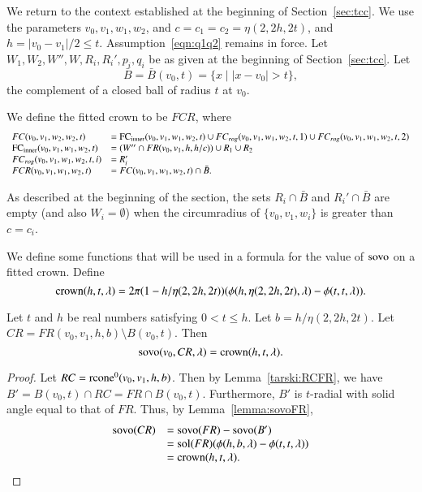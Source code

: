 We return to the context established at the beginning
of Section~\ref{sec:tcc}.  We use the parameters $v_0,v_1,w_1,w_2$,
and $c=c_1=c_2=\eta(2,2h,2t)$, and $h =|v_0-v_1|/2 \le t$. 
Assumption~\ref{eqn:q1q2} remains in force.
Let $W_1,W_2,W'',W,R_i,R_i',p_i,q_i$ be as given at the
beginning of Section~\ref{sec:tcc}.
%
Let 
  $$\bar B = \bar B(v_0,t) = \{x \mid |x-v_0| > t\},$$
the complement of a closed ball of radius $t$ at $v_0$.
%
\begin{definition}\label{def:fitted-crown}
We define the fitted crown to be $FCR$, where
$$
\begin{array}{lll}
FC(v_0,v_1,w_2,w_2,t) &= \FCinner(v_0,v_1,w_1,w_2,t) \cup 
      FC_{rog} (v_0,v_1,w_1,w_2,t,1)\cup FC_{rog}(v_0,v_1,w_1,w_2,t,2)\\
%
\FCinner(v_0,v_1,w_1,w_2,t) &= (W'' \cap FR(v_0,v_1,h,h/c))\cup R_1 \cup R_2 \\
%
FC_{rog} (v_0,v_1,w_1,w_2,t,i) &= R_i'\\
%
FCR(v_0,v_1,w_1,w_2,t) &= FC(v_0,v_1,w_1,w_2,t) \cap \bar B.
\end{array}
$$
\end{definition}

As described at the beginning of the section, the 
sets $R_i\cap \bar B$ and $R_i'\cap \bar B$ are empty
(and also $W_i=\emptyset$) when the circumradius of 
$\{v_0,v_1,w_i\}$ is greater than $c=c_i$.

We define some functions that will be used in a formula
for the value of ${\operatorname{sovo}}$ on a fitted crown.
Define
\begin{equation}\operatorname{crown}(h,t,\lambda) =
2\pi(1-h/\eta(2,2h,2t))(\phi(h,\eta(2,2h,2t),\lambda)-\phi(t,t,\lambda)). 
\end{equation} 

\begin{lemma}\label{lemma:sovo:CR} 
Let $t$ and $h$ be real numbers satisfying 
$0 < t \le h$.
Let $b=h/\eta(2,2h,2t)$.
Let $CR=FR(v_0,v_1,h,b) \setminus B(v_0,t)$.
  Then
$${\operatorname{sovo}}(v_0,CR,\lambda) = \operatorname{crown}(h,t,\lambda).$$
\end{lemma}

\begin{proof}  Let $RC={\operatorname{rcone}}^0(v_0,v_1,h,b)$.
Then by Lemma~\ref{tarski:RCFR}, we have
$B' = B(v_0,t)\cap RC = FR\cap B(v_0,t)$.
Furthermore, $B'$ is $t$-radial with solid angle equal to that
of $FR$.  Thus, by Lemma~\ref{lemma:sovoFR},
$$
\begin{array}{lll}
{\operatorname{sovo}}(CR) &= {\operatorname{sovo}}(FR) - {\operatorname{sovo}}(B')\\
 &= {\operatorname{sol}}(FR) (\phi(h,b,\lambda) - \phi(t,t,\lambda))\\
 &= \operatorname{crown}(h,t,\lambda).
\end{array}
$$
\end{proof}

